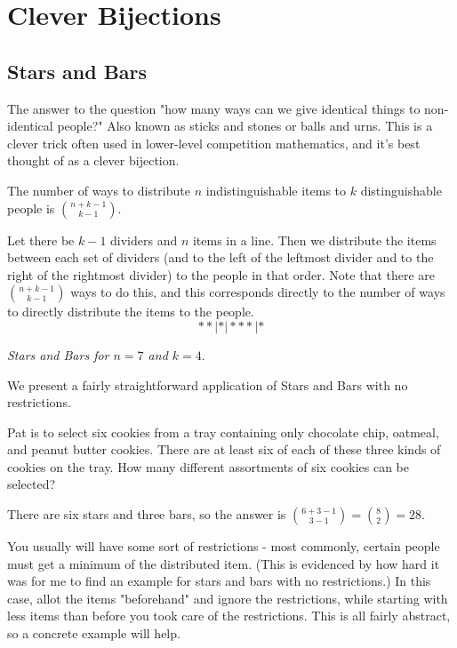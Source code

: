 \section{Clever Bijections}

\subsection{Stars and Bars}
The answer to the question "how many ways can we give identical things to non-identical people?" Also known as sticks and stones or balls and urns. This is a clever trick often used in lower-level competition mathematics, and it's best thought of as a clever bijection.

\begin{theo}
The number of ways to distribute $n$ indistinguishable items to $k$ distinguishable people is $\binom{n+k-1}{k-1}.$
\end{theo}

\begin{pro}
Let there be $k-1$ dividers and $n$ items in a line. Then we distribute the items between each set of dividers (and to the left of the leftmost divider and to the right of the rightmost divider) to the people in that order. Note that there are $\binom{n+k-1}{k-1}$ ways to do this, and this corresponds directly to the number of ways to directly distribute the items to the people.
\[**|*|***|*\]
\begin{center}
    \textit{Stars and Bars for $n=7$ and $k=4.$}
\end{center}
\end{pro}

We present a fairly straightforward application of Stars and Bars with no restrictions.

\begin{exam}[AMC 10A 2003/21]
Pat is to select six cookies from a tray containing only chocolate chip, oatmeal, and peanut butter cookies. There are at least six of each of these three kinds of cookies on the tray. How many different assortments of six cookies can be selected?
\end{exam}

\begin{sol}
There are six stars and three bars, so the answer is $\binom{6+3-1}{3-1}=\binom{8}{2}=28.$
\end{sol}

You usually will have some sort of restrictions - most commonly, certain people must get a minimum of the distributed item. (This is evidenced by how hard it was for me to find an example for stars and bars with no restrictions.) In this case, allot the items "beforehand" and ignore the restrictions, while starting with less items than before you took care of the restrictions. This is all fairly abstract, so a concrete example will help.

